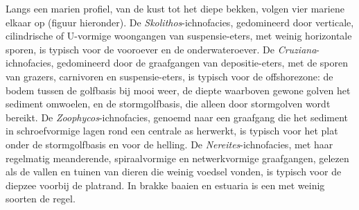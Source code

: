 Langs een marien profiel, van de kust tot het diepe bekken, volgen vier mariene  elkaar
op (figuur hieronder). De \emph{Skolithos}-ichnofacies, gedomineerd door verticale, cilindrische of
U-vormige woongangen van suspensie-eters, met weinig horizontale sporen, is typisch voor de
vooroever en de onderwateroever. De \emph{Cruziana}-ichnofacies, gedomineerd door de graafgangen van
depositie-eters, met de sporen van grazers, carnivoren en suspensie-eters, is typisch voor de
offshorezone: de bodem tussen de golfbasis bij mooi weer, de diepte waarboven gewone golven
het sediment omwoelen, en de stormgolfbasis, die alleen door stormgolven wordt bereikt. De \emph{Zoophycos}-ichnofacies,
genoemd naar een graafgang die het sediment in schroefvormige lagen rond een centrale
as herwerkt, is typisch voor het plat onder de stormgolfbasis en voor de helling. De \emph{Nereites}-ichnofacies,
met haar regelmatig meanderende, spiraalvormige en netwerkvormige graafgangen, gelezen als de vallen en
tuinen van dieren die weinig voedsel vonden, is typisch voor de diepzee voorbij de platrand. In
brakke baaien en estuaria is een  met weinig soorten de regel.

